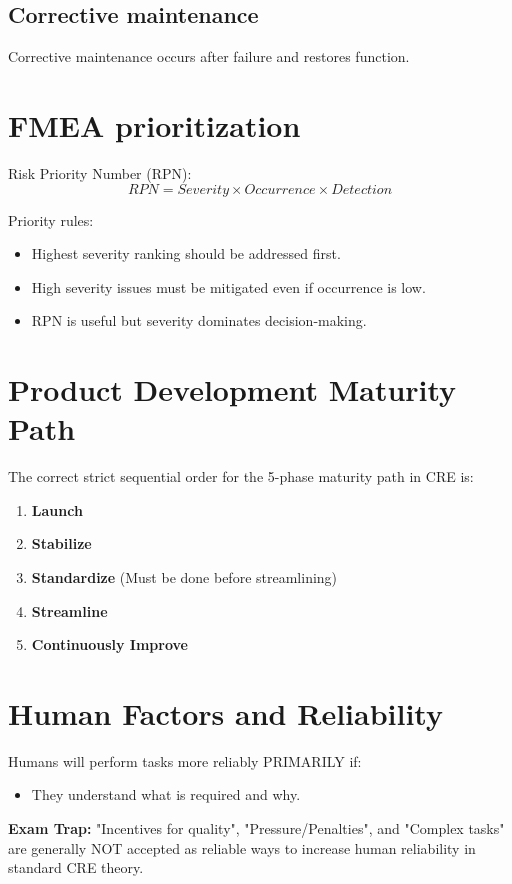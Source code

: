 \documentclass[10pt,a4paper,twocolumn]{article}
\begin{document}
\subsection*{Corrective maintenance}

Corrective maintenance occurs after failure and restores function.

\section*{FMEA prioritization}

Risk Priority Number (RPN):
\[RPN = Severity \times Occurrence \times Detection\]

Priority rules:
\begin{itemize}
\item Highest severity ranking should be addressed first.
\item High severity issues must be mitigated even if occurrence is low.
\item RPN is useful but severity dominates decision-making.
\end{itemize}

\section*{Product Development Maturity Path}

The correct strict sequential order for the 5-phase maturity path in CRE is:
\begin{enumerate}[leftmargin=*,itemsep=0pt]
\item \textbf{Launch}
\item \textbf{Stabilize}
\item \textbf{Standardize} (Must be done before streamlining)
\item \textbf{Streamline}
\item \textbf{Continuously Improve}
\end{enumerate}

\section*{Human Factors and Reliability}

Humans will perform tasks more reliably PRIMARILY if:
\begin{itemize}[leftmargin=*,itemsep=0pt]
\item They understand what is required and why.
\end{itemize}
\textbf{Exam Trap:} "Incentives for quality", "Pressure/Penalties", and "Complex tasks" are generally NOT accepted as reliable ways to increase human reliability in standard CRE theory.
\end{document}
